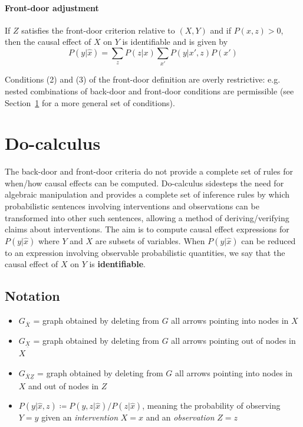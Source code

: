 \documentclass[11pt]{article}
\numberwithin{equation}{section}
\newcommand{\defeq}{\coloneqq}
\begin{document}
\paragraph{Front-door adjustment}
If $Z$ satisfies the front-door criterion relative to $(X, Y)$ and if $P(x, z) > 0$, then the causal effect of $X$ on $Y$ is identifiable and is given by
\begin{equation}
P(y|\hat{x}) = \sum_z P(z|x) \sum_{x'} P(y|x',z)P(x')
\end{equation}

Conditions (2) and (3) of the front-door definition are overly restrictive: e.g. nested combinations of back-door and front-door conditions are permissible (see Section~\ref{sec:do-calc} for a more general set of conditions).

\section{Do-calculus} \label{sec:do-calc}

The back-door and front-door criteria do not provide a complete set of rules for when/how causal effects can be computed. Do-calculus sidesteps the need for algebraic manipulation and provides a complete set of inference rules by which probabilistic sentences involving interventions and observations can be transformed into other such sentences, allowing a method of deriving/verifying claims about interventions. The aim is to compute causal effect expressions for $P(y|\hat{x})$ where $Y$ and $X$ are subsets of variables. When $P(y|\hat{x})$ can be reduced to an expression involving observable probabilistic quantities, we say that the causal effect of $X$ on $Y$ is \textbf{identifiable}.

\subsection{Notation}
\begin{itemize}[noitemsep]
\item $G_{\overline{X}}$ = graph obtained by deleting from $G$ all arrows pointing into nodes in $X$
\item $G_{\underline{X}}$ = graph obtained by deleting from $G$ all arrows pointing out of nodes in $X$
\item $G_{\overline{X}\underline{Z}}$ = graph obtained by deleting from $G$ all arrows pointing into nodes in $X$ and out of nodes in $Z$
\item $P(y|\hat{x},z) \defeq P(y,z|\hat{x}) / P(z|\hat{x})$, meaning the probability of observing $Y=y$ given an \textit{intervention} $X=x$ and an \textit{observation} $Z=z$
\end{itemize}
\end{document}
